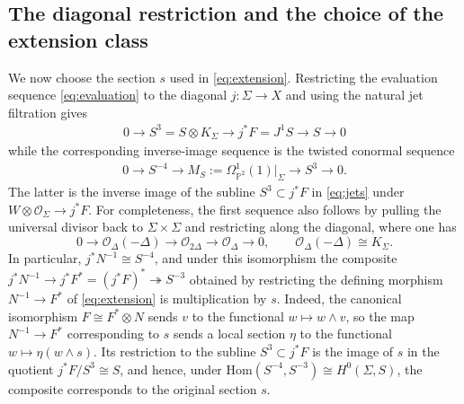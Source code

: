 \documentclass[oneside,11pt]{amsart}
\theoremstyle{definition}
\theoremstyle{remark}
\numberwithin{thm}{section}
\numberwithin{equation}{section}
\begin{document}
\subsection{The diagonal restriction and the choice of the extension class}

We now choose the section $s$ used in \eqref{eq:extension}.  Restricting the evaluation sequence \eqref{eq:evaluation} to the diagonal $j:\Sigma\to X$ and using the natural jet filtration gives
\begin{align}\label{eq:jets}
 0\longrightarrow S^3=S\otimes K_\Sigma
 \longrightarrow j^*F=J^1S\longrightarrow S\longrightarrow0
\end{align}
while the corresponding inverse-image sequence is the twisted conormal sequence
\begin{align}\label{eq:conormal}
 0\longrightarrow S^{-4}\longrightarrow
 M_S:=\Omega_{\mathbb{P}^2}^1(1)|_\Sigma
 \longrightarrow S^3\longrightarrow0.
\end{align}
The latter is the inverse image of the subline $S^3\subset j^*F$ in \eqref{eq:jets} under $W\otimes\mathcal{O}_\Sigma\to j^*F$.    For completeness, the first sequence also follows by pulling the universal divisor back to $\Sigma\times\Sigma$ and restricting along the diagonal, where one has
\[
 0\longrightarrow\mathcal{O}_{\Delta}(-\Delta)
 \longrightarrow\mathcal{O}_{2\Delta}
 \longrightarrow\mathcal{O}_{\Delta}\longrightarrow0,
 \qquad
 \mathcal{O}_{\Delta}(-\Delta)\cong K_\Sigma.
\]
In particular, $j^*N^{-1}\cong S^{-4}$, and under this isomorphism the composite
$j^*N^{-1}\to j^*F^*=(j^*F)^*\twoheadrightarrow S^{-3}$ obtained by restricting the defining morphism $N^{-1}\to F^*$ of
\eqref{eq:extension} is multiplication by $s$.  Indeed, the
canonical isomorphism $F\cong F^*\otimes N$ sends $v$ to the functional $w\mapsto w\wedge v$, so the map $N^{-1}\to F^*$ corresponding to $s$ sends a local section $\eta$ to the functional $w\mapsto\eta(w\wedge s)$.  Its restriction to the subline $S^3\subset j^*F$ is the image of $s$ in the quotient
$j^*F/S^3\cong S$, and hence, under $\mathrm{Hom}(S^{-4},S^{-3})\cong H^0(\Sigma,S)$, the composite corresponds
to the original section $s$.
\end{document}
